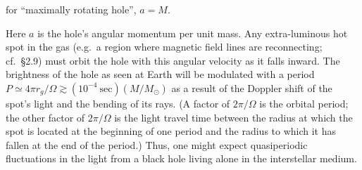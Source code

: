 \documentclass[aps,prd,twocolumn,superscriptaddress,nofootinbib]{revtex4-2}
\begin{document}
for ``maximally rotating hole'', $a = M$.

Here $a$ is the hole's angular momentum per unit mass.  Any extra-luminous hot
spot in the gas (e.g.\ a region where magnetic field lines are reconnecting; cf.\
\S2.9) must orbit the hole with this angular velocity as it falls inward.  The
brightness of the hole as seen at Earth will be modulated with a period
$P \simeq 4\pi r_g/\Omega \gtrsim (10^{-4}~\text{sec})(M/M_\odot)$ as a result of the Doppler shift of the spot's
light and the bending of its rays.  (A factor of $2\pi/\Omega$ is the orbital period; the
other factor of $2\pi/\Omega$ is the light travel time between the radius at which the
spot is located at the beginning of one period and the radius to which it has
fallen at the end of the period.)  Thus, one might expect quasiperiodic
fluctuations in the light from a black hole living alone in the interstellar medium.


\end{document}
